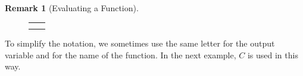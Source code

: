 \documentclass[10pt,]{book}
\theoremstyle{plain}
\theoremstyle{definition}
\newtheorem{remark}[theorem]{Remark}
\theoremstyle{definition}
\theoremstyle{definition}
\newlength{\panelmax}
\begin{document}
\begin{remark}[Evaluating a Function]
{{}
\newlength{\phFimage}\setlength{\phFimage}{\ht\panelboxFimage+\dp\panelboxFimage}
\settototalheight{\phFimage}{\usebox{\panelboxFimage}}
\setlength{\panelmax}{\maxof{\panelmax}{\phFimage}}
\newsavebox{\panelboxGimage}
\newlength{\phGimage}\setlength{\phGimage}{\ht\panelboxGimage+\dp\panelboxGimage}
\settototalheight{\phGimage}{\usebox{\panelboxGimage}}
\setlength{\panelmax}{\maxof{\panelmax}{\phGimage}}
\leavevmode%
\setlength{\tabcolsep}{0\textwidth}
\begin{figure}
\begin{tabular}{@{}*{2}{c}@{}}
\begin{minipage}[c][\panelmax][t]{0.5\textwidth}\usebox{\panelboxFimage}\end{minipage}&
\begin{minipage}[c][\panelmax][t]{0.5\textwidth}\usebox{\panelboxGimage}\end{minipage}\tabularnewline
\parbox[t]{0.5\textwidth}{
}&
\parbox[t]{0.5\textwidth}{
}\end{tabular}
\end{figure}
}%
%
\end{remark}
To simplify the notation, we sometimes use the same letter for the output variable and for the name of the function. In the next example, \(C\) is used in this way.%
\end{document}

